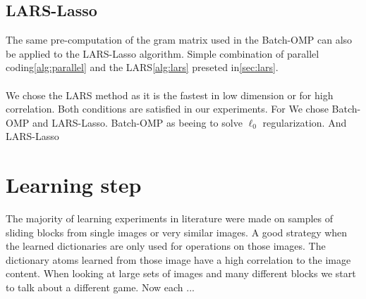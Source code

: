 


\subsection{LARS-Lasso}


The same pre-computation of the gram matrix used in the Batch-OMP can also
be applied to the LARS-Lasso algorithm. Simple combination of
parallel coding\ref{alg:parallel} and the LARS\ref{alg:lars} preseted
in\ref{sec:lars}.

\paragraph{}
We chose the LARS method as it is the fastest in low dimension or for
high correlation. Both conditions are satisfied in our experiments.
For 
We chose Batch-OMP  and LARS-Lasso. Batch-OMP as beeing to solve $\ell_0$
regularization. And LARS-Lasso 

\section{Learning step}
The majority of learning experiments in literature were made on
samples of sliding blocks from single images or very similar images.
A good strategy when the learned dictionaries are only used for operations on
those images. The dictionary atoms learned from those image have a high
correlation to the image content.  When looking at large sets of images and many
different blocks we start to talk about a different game. Now each ...

